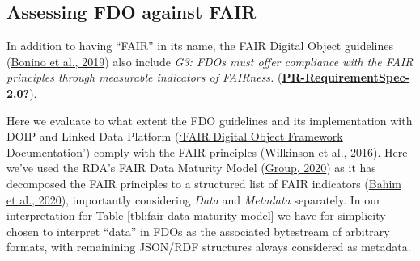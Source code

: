 \hypertarget{sec:fair-compare}{%
\subsection{Assessing FDO against FAIR}\label{sec:fair-compare}}

In addition to having ``FAIR'' in its name, the FAIR Digital Object guidelines (\protect\hyperlink{ref-RwvirqWg}{Bonino et al., 2019}) also include \emph{G3: FDOs must offer compliance with the FAIR principles through measurable indicators of FAIRness.} (\protect\hyperlink{ref-PR-RequirementSpec-2.0}{\textbf{PR-RequirementSpec-2.0?}}).

Here we evaluate to what extent the FDO guidelines and its implementation with DOIP and Linked Data Platform (\protect\hyperlink{ref-7szz7dwO}{{`FAIR Digital Object Framework Documentation'}}) comply with the FAIR principles (\protect\hyperlink{ref-6DjakjNS}{Wilkinson et al., 2016}). Here we've used the RDA's FAIR Data Maturity Model (\protect\hyperlink{ref-1GrKTFaK2}{Group, 2020}) as it has decomposed the FAIR principles to a structured list of FAIR indicators (\protect\hyperlink{ref-UzQhqk0M}{Bahim et al., 2020}), importantly considering \emph{Data} and \emph{Metadata} separately. In our interpretation for Table \ref{tbl:fair-data-maturity-model} we have for simplicity chosen to interpret ``data'' in FDOs as the associated bytestream of arbitrary formats, with remainining JSON/RDF structures always considered as metadata.

